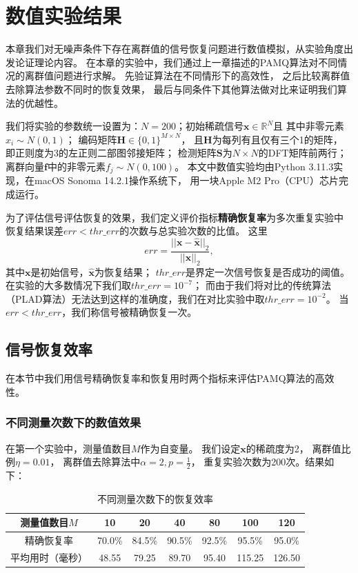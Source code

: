 \documentclass[AutoFakeBold]{LZUThesis}
\begin{document}
\chapter{数值实验结果}
\label{result}

本章我们对无噪声条件下存在离群值的信号恢复问题进行数值模拟，从实验角度出发论证理论内容。
在本章的实验中，我们通过上一章描述的PAMQ算法对不同情况的离群值问题进行求解。
先验证算法在不同情形下的高效性，
之后比较离群值去除算法参数不同时的恢复效果，
最后与同条件下其他算法做对比来证明我们算法的优越性。

我们将实验的参数统一设置为：$N = 200$；初始稀疏信号$\mathbf{x} \in \mathbb{R}^N$且
其中非零元素$x_i \sim N(0,1)$；
编码矩阵$\mathbf{H} \in \{0, 1\}^{M \times N}$，
且$\mathbf{H}$为每列有且仅有三个1的矩阵，
即正则度为3的左正则二部图邻接矩阵；
检测矩阵$\mathbf{S}$为$N \times N$的DFT矩阵前两行；
离群向量$\mathbf{f}$中的非零元素$f_j \sim N(0,100)$。
本文中数值实验均由Python 3.11.3实现，在macOS Sonoma 14.2.1操作系统下，
用一块Apple M2 Pro（CPU）芯片完成运行。

为了评估信号评估恢复的效果，我们定义评价指标\textbf{精确恢复率}为多次重复实验中
恢复结果误差$err < thr\_err$的次数与总实验次数的比值。
这里
\begin{equation}
    err = \frac{||{\mathbf{x} - \hat{\mathbf{x}}}||_2}{||\mathbf{x}||_2}, 
\end{equation}
其中$\mathbf{x}$是初始信号，$\hat{\mathbf{x}}$为恢复结果；
$thr\_err$是界定一次信号恢复是否成功的阈值。
在实验的大多数情况下我们取$thr\_err = 10^{-7}$；
而由于我们将对比的传统算法（PLAD算法）无法达到这样的准确度，我们在对比实验中取$thr\_err = 10^{-2}$。
当$err < thr\_err$，我们称信号被精确恢复一次。

\section{信号恢复效率}

在本节中我们用信号精确恢复率和恢复用时两个指标来评估PAMQ算法的高效性。

\subsection{不同测量次数下的数值效果}

在第一个实验中，测量值数目$M$作为自变量。
我们设定$\mathbf{x}$的稀疏度为2，
离群值比例$\eta=0.01$，
离群值去除算法中$\alpha = 2, p = \frac{1}{2}$，
重复实验次数为200次。结果如下：

\begin{table}[H]
    \centering
    \caption{不同测量次数下的恢复效率}
    \begin{tabular}{ccccccc} %
        \toprule
        测量值数目$M$ & 10  & 20  & 40  & 80 & 100 & 120 \\
        \toprule
        精确恢复率 & 70.0\% & 84.5\% & 90.5\%  & 92.5\% & 95.5\% & 95.0\% \\
        \midrule
        平均用时（毫秒） & 48.55 & 79.25 & 89.70 & 95.40 & 115.25 & 126.50 \\
        \bottomrule
    \end{tabular}
    \label{effeciency}
\end{table}
\end{document}
